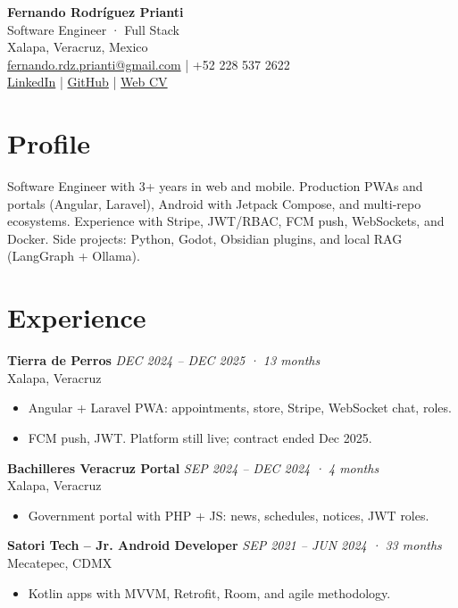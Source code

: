 \documentclass[letterpaper,10pt]{article}
\begin{document}
\begin{center}
    {\Large \textbf{Fernando Rodríguez Prianti}}\\[0.1cm]
    {\large Software Engineer · Full Stack}\\[0.15cm]
    Xalapa, Veracruz, Mexico \\
    \href{mailto:fernando.rdz.prianti@gmail.com}{fernando.rdz.prianti@gmail.com} \quad | \quad +52 228 537 2622 \\
    \href{https://www.linkedin.com/in/fernando-rodr{\'i}guez-732670140/}{LinkedIn} \quad | \quad
    \href{https://github.com/FernandoRP-nan}{GitHub} \quad | \quad
    \href{https://fernandorp-nan.github.io/fernando-cv/}{Web CV}
\end{center}

\section*{Profile}
Software Engineer with 3+ years in web and mobile. Production PWAs and portals (Angular, Laravel), Android with Jetpack Compose, and multi-repo ecosystems. Experience with Stripe, JWT/RBAC, FCM push, WebSockets, and Docker. Side projects: Python, Godot, Obsidian plugins, and local RAG (LangGraph + Ollama).

\section*{Experience}
\textbf{Tierra de Perros} \hfill \textit{DEC 2024 -- DEC 2025 · 13 months}\\
Xalapa, Veracruz
\begin{itemize}
    \item Angular + Laravel PWA: appointments, store, Stripe, WebSocket chat, roles.
    \item FCM push, JWT. Platform still live; contract ended Dec 2025.
\end{itemize}

\textbf{Bachilleres Veracruz Portal} \hfill \textit{SEP 2024 -- DEC 2024 · 4 months}\\
Xalapa, Veracruz
\begin{itemize}
    \item Government portal with PHP + JS: news, schedules, notices, JWT roles.
\end{itemize}

\textbf{Satori Tech -- Jr. Android Developer} \hfill \textit{SEP 2021 -- JUN 2024 · 33 months}\\
Mecatepec, CDMX
\begin{itemize}
    \item Kotlin apps with MVVM, Retrofit, Room, and agile methodology.
\end{itemize}
\end{document}
